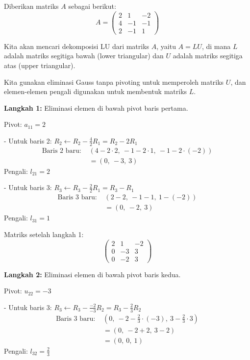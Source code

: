 \documentclass{article}
\begin{document}
Diberikan matriks $ A $ sebagai berikut:
\[
A = 
\begin{pmatrix}
2 & 1 & -2 \\
4 & -1 & -1 \\
2 & -1 & 1
\end{pmatrix}
\]

Kita akan mencari dekomposisi LU dari matriks $ A $, yaitu $ A = LU $, di mana $ L $ adalah matriks segitiga bawah (lower triangular) dan $ U $ adalah matriks segitiga atas (upper triangular).

Kita gunakan eliminasi Gauss tanpa pivoting untuk memperoleh matriks $ U $, dan elemen-elemen pengali digunakan untuk membentuk matriks $ L $.

\textbf{Langkah 1:} Eliminasi elemen di bawah pivot baris pertama.

Pivot: $ a_{11} = 2 $

- Untuk baris 2: $ R_2 \leftarrow R_2 - \frac{4}{2} R_1 = R_2 - 2R_1 $
  \[
  \begin{aligned}
  \text{Baris 2 baru: } & (4 - 2\cdot2,\ -1 - 2\cdot1,\ -1 - 2\cdot(-2)) \\
  &= (0,\ -3,\ 3)
  \end{aligned}
  \]
  Pengali: $ l_{21} = 2 $

- Untuk baris 3: $ R_3 \leftarrow R_3 - \frac{2}{2} R_1 = R_3 - R_1 $
  \[
  \begin{aligned}
  \text{Baris 3 baru: } & (2 - 2,\ -1 - 1,\ 1 - (-2)) \\
  &= (0,\ -2,\ 3)
  \end{aligned}
  \]
  Pengali: $ l_{31} = 1 $

Matriks setelah langkah 1:
\[
\begin{pmatrix}
2 & 1 & -2 \\
0 & -3 & 3 \\
0 & -2 & 3
\end{pmatrix}
\]

\textbf{Langkah 2:} Eliminasi elemen di bawah pivot baris kedua.

Pivot: $ u_{22} = -3 $

- Untuk baris 3: $ R_3 \leftarrow R_3 - \frac{-2}{-3} R_2 = R_3 - \frac{2}{3} R_2 $
  \[
  \begin{aligned}
  \text{Baris 3 baru: } & \left(0,\ -2 - \frac{2}{3}\cdot(-3),\ 3 - \frac{2}{3}\cdot3\right) \\
  &= (0,\ -2 + 2,\ 3 - 2) \\
  &= (0,\ 0,\ 1)
  \end{aligned}
  \]
  Pengali: $ l_{32} = \frac{2}{3} $
\end{document}

